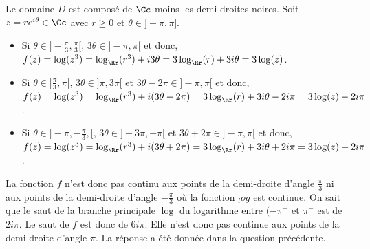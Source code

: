 {\begin{enumerate}
{Le domaine $D$ est composé de $\Cc$ moins les demi-droites noires. 
Soit $z=re^{i\theta}\in\Cc$ avec $r\geq 0$ et $\theta\in ]-\pi,\pi]$.
\begin{itemize}
\item Si $\theta\in]-\frac{\pi}{3},\frac{\pi}{3}[$, $ 3\theta\in]-\pi,\pi[$
 et donc, $f(z)=\log(z^3)=\log_\Rr(r^3)+i3\theta=3\log_\Rr(r)+3i\theta=3\log(z)$.
\item Si $\theta\in]\frac{\pi}{3},\pi[$, $ 3\theta\in]\pi,3\pi[$ et $ 3\theta-2\pi\in]-\pi,\pi[$
 et donc, $f(z)=\log(z^3)=\log_\Rr(r^3)+i(3\theta-2\pi)=3\log_\Rr(r)+3i\theta-2i\pi=3\log(z)-2i\pi$.
\item Si $\theta\in]-\pi,-\frac{\pi}{3},[$, $ 3\theta\in]-3\pi,-\pi[$ et $ 3\theta+2\pi\in]-\pi,\pi[$
 et donc, $f(z)=\log(z^3)=\log_\Rr(r^3)+i(3\theta+2\pi)=3\log_\Rr(r)+3i\theta+2i\pi=3\log(z)+2i\pi$.
\end{itemize}
La fonction $f$ n'est donc pas continu aux points de la demi-droite d'angle $\frac{\pi}{3}$ 
ni aux points de la demi-droite d'angle $-\frac{\pi}{3}$ où la fonction $_log$ est continue.
On sait que le saut de la branche principale $\log$ du logarithme entre $(-\pi^+$ et $\pi^-$
est de $2i\pi$. Le saut de $f$ est donc de $6i\pi$. Elle n'est donc pas continue
aux points de la demi-droite d'angle $\pi$.
La réponse a été donnée dans la question précédente.
}
\end{enumerate}
}
